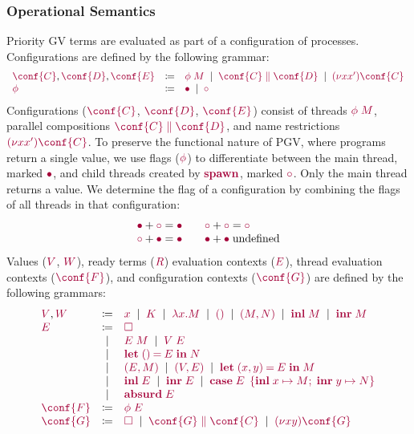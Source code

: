 \documentclass[main.tex]{subfiles}
\begin{document}
\subsubsection*{Operational Semantics}
Priority GV terms are evaluated as part of a configuration of processes. Configurations are defined by the following grammar:
\[
\begin{array}[t]{lcl}
    \tm{\conf{C}}, \tm{\conf{D}}, \tm{\conf{E}}
  & \coloneqq & \tm{\phi\;M}
    \sep        \tm{\ppar{\conf{C}}{\conf{D}}}
    \sep        \tm{\res{x}{x'}{\conf{C}}}
  \\
  \tm{\phi}
  & \coloneqq & \tm{\main}
    \sep        \tm{\child}
\end{array}
\]
Configurations ($\tm{\conf{C}}$, $\tm{\conf{D}}$, $\tm{\conf{E}}$) consist of threads $\tm{\phi\;M}$, parallel compositions $\tm{\ppar{\conf{C}}{\conf{D}}}$, and name restrictions $\tm{\res{x}{x'}{\conf{C}}}$. To preserve the functional nature of PGV, where programs return a single value, we use flags ($\tm{\phi}$) to differentiate between the main thread, marked $\tm{\main}$, and child threads created by $\tm{\spawn}$, marked $\tm{\child}$. Only the main thread returns a value. We determine the flag of a configuration by combining the flags of all threads in that configuration:
\[
\begin{array}{ll}
  \tm{\main}  + \tm{\child} = \tm{\main}
  \\
  \tm{\child} + \tm{\main}  = \tm{\main}
\end{array}
\quad
\begin{array}{ll}
  \tm{\child} + \tm{\child} = \tm{\child}
  \\
  \tm{\main}  + \tm{\main} \; \text{undefined}
\end{array}
\]
Values ($\tm{V}$, $\tm{W}$), ready terms ($\tm{R}$) evaluation contexts ($\tm{E}$), thread evaluation contexts ($\tm{\conf{F}}$), and configuration contexts ($\tm{\conf{G}}$) are defined by the following grammars:
\[
\begin{array}[t]{lcl}
  \tm{V}, \tm{W}
  & \coloneqq & \tm{x}
    \sep        \tm{K}
    \sep        \tm{\lambda x.M}
    \sep        \tm{\unit}
    \sep        \tm{\pair{M}{N}}
    \sep        \tm{\inl{M}}
    \sep        \tm{\inr{M}}
  \\
  \tm{E}
  & \coloneqq & \tm{\hole} \\
  & \sep      & \tm{E\;M}
    \sep        \tm{V\;E} \\
  & \sep      & \tm{\letunit{E}{N}} \\
  & \sep      & \tm{\pair{E}{M}}
    \sep        \tm{\pair{V}{E}}
    \sep        \tm{\letpair{x}{y}{E}{M}} \\
  & \sep      & \tm{\inl{E}}
    \sep        \tm{\inr{E}}
    \sep        \tm{\casesum{E}{x}{M}{y}{N}} \\
  & \sep      & \tm{\absurd{E}}
  \\
  \tm{\conf{F}}
  & \coloneqq & \tm{\phi\;E}
  \\
  \tm{\conf{G}}
  & \coloneqq & \tm{\hole}
    \sep        \tm{\ppar{\conf{G}}{\conf{C}}}
    \sep        \tm{\res{x}{y}{\conf{G}}}
\end{array}
\]
\end{document}
